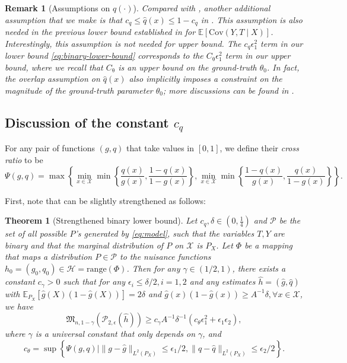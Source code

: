 \documentclass{article}
\def\eps{{\epsilon}}
\def\gH{{\mathcal{H}}}
\def\gP{{\mathcal{P}}}
\def\gX{{\mathcal{X}}}
\newcommand{\E}{\mathbb{E}}
\newtheorem{theorem}{Theorem}[section]
\newtheorem{remark}{Remark}[section]
\begin{document}
\begin{remark}[Assumptions on $\hat{q}(\cdot)$]
    Compared with , another additional assumption that we make is that $c_q \leq\hat{q}(x)\leq 1-c_q$ in . This assumption is also needed in the previous lower bound established in \citet{balakrishnan2023fundamental} for $\E[\mathrm{Cov}(Y,T\mid X)]$. Interestingly, this assumption is not needed for upper bound. The $c_q\eps_1^2$ term in our lower bound \eqref{eq:binary-lower-bound} corresponds to the $C_{\uptheta}\eps_1^2$ term in our upper bound, where we recall that $C_{\uptheta}$ is an upper bound on the ground-truth $\theta_0$. In fact, the overlap assumption on $\hat{q}(x)$ also implicitly imposes a constraint on the magnitude of the ground-truth parameter $\theta_0$; more discussions can be found in .
\end{remark}


\subsection{Discussion of the constant $c_q$}

\label{subsec:constant-c_q}

For any pair of functions $(g,q)$ that take values in $[0,1]$, we define their \textit{cross ratio} to be
$$\Psi(g,q) = \max\left\{ \min_{x\in\gX}\min\left\{\frac{q(x)}{g(x)},\frac{1-q(x)}{1-g(x)}\right\}, \min_{x\in\gX}\min\left\{\frac{1-q(x)}{g(x)},\frac{q(x)}{1-g(x)}\right\} \right\}.$$

First, note that  can be slightly strengthened as follows:

\begin{theorem}[Strengthened binary lower bound]
\label{thm:binary-lower-bound-strengthen}
    Let $c_q,\delta\in(0,\frac{1}{4})$ and $\gP$ be the set of all possible $P$'s generated by \eqref{eq:model}, such that the variables $T,Y$ are binary and that the marginal distribution of $P$ on $\gX$ is $P_X$. Let $\Phi$ be a mapping that maps a distribution $P\in\gP$ to the nuisance functions $h_0=(g_0,q_0)\in\gH=\mathrm{range}(\Phi)$. Then for any $\gamma\in(1/2,1)$, there exists a constant $c_{\gamma}>0$ such that for any $\eps_i\leq \delta/2, i=1,2$ and any estimates $\hat{h}=(\hat{g},\hat{q})$ with $\E_{P_X}[\hat{g}(X)(1-\hat{g}(X))]=2\delta$ and $\hat{g}(x)(1-\hat{g}(x))\geq A^{-1}\delta, \forall x\in\gX$, we have 
    \begin{equation}
        \label{eq:binary-lower-bound-strengthen}
        \mathfrak{M}_{n,1-\gamma}\left(\gP_{2,\eps}(\hat{h})\right) \geq c_{\gamma} A^{-1} \delta^{-1}(c_\theta\eps_1^2+\eps_1\eps_2),
    \end{equation}
    where $\gamma$ is a universal constant that only depends on $\gamma$, and
    $$c_{\theta} = \sup\left\{ \Psi(g,q) \mid \|g-\hat{g}\|_{L^2(P_X)}\leq\eps_1/2, \|q-\hat{q}\|_{L^2(P_X)}\leq\eps_2/2\right\}.$$
\end{theorem}
\end{document}
